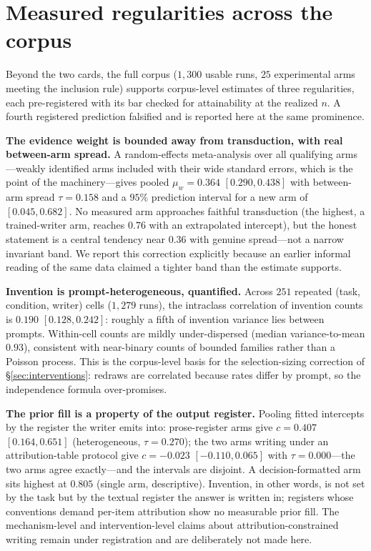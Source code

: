 \documentclass[11pt]{article}
\newcommand{\ww}{\ensuremath{w}}
\newcommand{\cc}{\ensuremath{c}}
\begin{document}
\section{Measured regularities across the corpus}
\label{sec:phenomena}

Beyond the two cards, the full corpus ($1{,}300$ usable runs, $25$
experimental arms meeting the inclusion rule) supports corpus-level
estimates of three regularities, each pre-registered with its bar checked
for attainability at the realized $n$. A fourth registered prediction
falsified and is reported here at the same prominence.

\textbf{The evidence weight is bounded away from transduction, with real
between-arm spread.} A random-effects meta-analysis over all qualifying
arms---weakly identified arms included with their wide standard errors,
which is the point of the machinery---gives pooled
$\mu_{\ww} = 0.364$ $[0.290, 0.438]$ with between-arm spread
$\tau = 0.158$ and a $95\%$ prediction interval for a new arm of
$[0.045, 0.682]$. No measured arm approaches faithful transduction (the
highest, a trained-writer arm, reaches $0.76$ with an extrapolated
intercept), but the honest statement is a central tendency near $0.36$
with genuine spread---not a narrow invariant band. We report this
correction explicitly because an earlier informal reading of the same
data claimed a tighter band than the estimate supports.

\textbf{Invention is prompt-heterogeneous, quantified.} Across $251$
repeated (task, condition, writer) cells ($1{,}279$ runs), the intraclass
correlation of invention counts is $0.190$ $[0.128, 0.242]$: roughly a
fifth of invention variance lies between prompts. Within-cell counts are
mildly under-dispersed (median variance-to-mean $0.93$), consistent with
near-binary counts of bounded families rather than a Poisson process.
This is the corpus-level basis for the selection-sizing correction of
\S\ref{sec:interventions}: redraws are correlated because rates differ
by prompt, so the independence formula over-promises.

\textbf{The prior fill is a property of the output register.} Pooling
fitted intercepts by the register the writer emits into: prose-register
arms give $\cc = 0.407$ $[0.164, 0.651]$ (heterogeneous,
$\tau = 0.270$); the two arms writing under an attribution-table
protocol give $\cc = -0.023$ $[-0.110, 0.065]$ with $\tau = 0.000$---the
two arms agree exactly---and the intervals are disjoint. A
decision-formatted arm sits highest at $0.805$ (single arm,
descriptive). Invention, in other words, is not set by the task but by
the textual register the answer is written in; registers whose
conventions demand per-item attribution show no measurable prior fill.
The mechanism-level and intervention-level claims about
attribution-constrained writing remain under registration and are
deliberately not made here.
\end{document}
